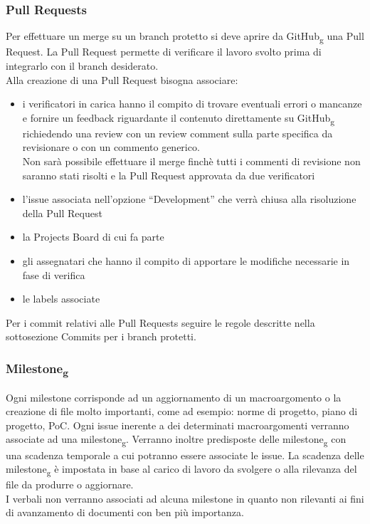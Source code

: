 \subsubsection{Pull Requests}
Per effettuare un merge su un branch protetto si deve aprire da GitHub\textsubscript{g} una Pull Request.
La Pull Request permette di verificare il lavoro svolto prima di integrarlo con il branch desiderato.\\
Alla creazione di una Pull Request bisogna associare:
\begin{itemize}
\item i verificatori in carica hanno il compito di trovare eventuali errori o mancanze e fornire un feedback riguardante il contenuto direttamente su GitHub\textsubscript{g} richiedendo
una review con un review comment sulla parte specifica da revisionare o con un commento generico.\\
Non sarà possibile effettuare il merge finchè tutti i commenti di revisione non saranno stati risolti e la Pull Request approvata da due verificatori
\item l’issue associata nell’opzione “Development” che verrà chiusa alla risoluzione della Pull Request
\item la Projects Board di cui fa parte
\item gli assegnatari che hanno il compito di apportare le modifiche necessarie in fase di verifica
\item le labels associate
\end{itemize}
Per i commit relativi alle Pull Requests seguire le regole descritte nella sottosezione Commits per i branch protetti.



\subsubsection{Milestone\textsubscript{g}}
Ogni milestone corrisponde ad un aggiornamento di un macroargomento o la creazione di file molto importanti, come ad esempio: norme di progetto, piano di progetto, PoC. Ogni issue inerente a dei determinati macroargomenti verranno associate ad una milestone\textsubscript{g}. Verranno inoltre predisposte delle milestone\textsubscript{g} con una scadenza temporale a cui potranno essere associate le issue. La scadenza delle milestone\textsubscript{g} è impostata in base al carico di lavoro da svolgere o alla rilevanza del file da produrre o aggiornare.\\ 
I verbali non verranno associati ad alcuna milestone in quanto non rilevanti ai fini di avanzamento di documenti con ben più importanza.




